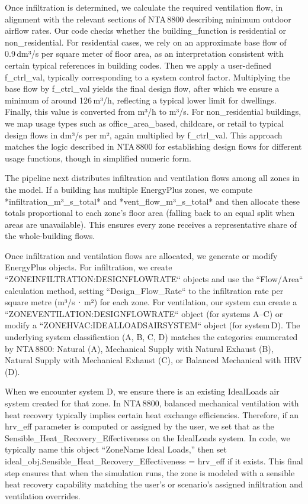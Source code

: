 Once infiltration is determined, we calculate the required ventilation flow, in alignment with the relevant sections of NTA 8800 describing minimum outdoor airflow rates. Our code checks whether the building_function is residential or non_residential. For residential cases, we rely on an approximate base flow of 0.9 dm³/s per square meter of floor area, as an interpretation consistent with certain typical references in building codes. Then we apply a user-defined f_ctrl_val, typically corresponding to a system control factor. Multiplying the base flow by f_ctrl_val yields the final design flow, after which we ensure a minimum of around 126 m³/h, reflecting a typical lower limit for dwellings. Finally, this value is converted from m³/h to m³/s. For non_residential buildings, we map usage types such as office_area_based, childcare, or retail to typical design flows in dm³/s per m², again multiplied by f_ctrl_val. This approach matches the logic described in NTA 8800 for establishing design flows for different usage functions, though in simplified numeric form.

The pipeline next distributes infiltration and ventilation flows among all zones in the model. If a building has multiple EnergyPlus zones, we compute *infiltration_m³_s_total* and *vent_flow_m³_s_total* and then allocate these totals proportional to each zone's floor area (falling back to an equal split when areas are unavailable). This ensures every zone receives a representative share of the whole-building flows.

Once infiltration and ventilation flows are allocated, we generate or modify EnergyPlus objects. For infiltration, we create ``ZONEINFILTRATION:DESIGNFLOWRATE`` objects and use the ``Flow/Area`` calculation method, setting ``Design_Flow_Rate`` to the infiltration rate per square metre (m³/s · m²) for each zone. For ventilation, our system can create a ``ZONEVENTILATION:DESIGNFLOWRATE`` object (for systems A–C) or modify a ``ZONEHVAC:IDEALLOADSAIRSYSTEM`` object (for system D). The underlying system classification (A, B, C, D) matches the categories enumerated by NTA 8800: Natural (A), Mechanical Supply with Natural Exhaust (B), Natural Supply with Mechanical Exhaust (C), or Balanced Mechanical with HRV (D).

When we encounter system D, we ensure there is an existing IdealLoads air system created for that zone. In NTA 8800, balanced mechanical ventilation with heat recovery typically implies certain heat exchange efficiencies. Therefore, if an hrv_eff parameter is computed or assigned by the user, we set that as the Sensible_Heat_Recovery_Effectiveness on the IdealLoads system. In code, we typically name this object “ZoneName Ideal Loads,” then set ideal_obj.Sensible_Heat_Recovery_Effectiveness = hrv_eff if it exists. This final step ensures that when the simulation runs, the zone is modeled with a sensible heat recovery capability matching the user’s or scenario’s assigned infiltration and ventilation overrides.

